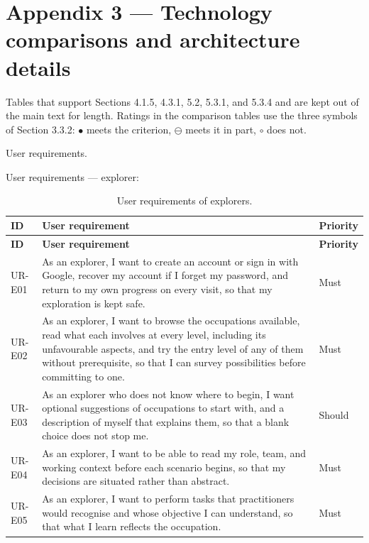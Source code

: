 \newpage
\section*{Appendix 3 --- Technology comparisons and architecture details}

Tables that support Sections 4.1.5, 4.3.1, 5.2, 5.3.1, and 5.3.4 and are kept out of the main text for length. Ratings in the comparison tables use the three symbols of Section 3.3.2: $\bullet$ meets the criterion, $\ominus$ meets it in part, $\circ$ does not.

User requirements.

User requirements --- explorer:

{\small
\begin{longtable}{|>{\raggedright\arraybackslash}p{}|>{\raggedright\arraybackslash}p{}|>{\raggedright\arraybackslash}p{}|}
\caption{User requirements of explorers.} \\
\hline
\textbf{ID} & \textbf{User requirement} & \textbf{Priority} \\ \hline
\endfirsthead
\hline
\textbf{ID} & \textbf{User requirement} & \textbf{Priority} \\ \hline
\endhead
UR-E01 & As an explorer, I want to create an account or sign in with Google, recover my account if I forget my password, and return to my own progress on every visit, so that my exploration is kept safe. & Must \\ \hline
UR-E02 & As an explorer, I want to browse the occupations available, read what each involves at every level, including its unfavourable aspects, and try the entry level of any of them without prerequisite, so that I can survey possibilities before committing to one. & Must \\ \hline
UR-E03 & As an explorer who does not know where to begin, I want optional suggestions of occupations to start with, and a description of myself that explains them, so that a blank choice does not stop me. & Should \\ \hline
UR-E04 & As an explorer, I want to be able to read my role, team, and working context before each scenario begins, so that my decisions are situated rather than abstract. & Must \\ \hline
UR-E05 & As an explorer, I want to perform tasks that practitioners would recognise and whose objective I can understand, so that what I learn reflects the occupation. & Must \\ \hline

\end{longtable}}
